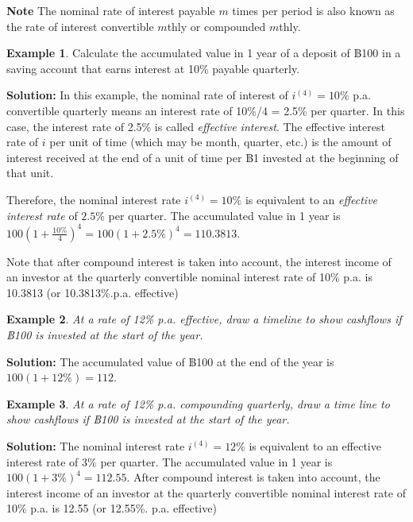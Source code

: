 \documentclass[
]{book}
\theoremstyle{definition}
\theoremstyle{definition}
\newtheorem{example}{Example}[chapter]
\theoremstyle{definition}
\theoremstyle{definition}
\theoremstyle{remark}
\begin{document}
\textbf{Note} The nominal rate of interest payable \(m\) times per period is also known as the rate of interest convertible \(m\)thly or compounded \(m\)thly.

\begin{example}
Calculate the accumulated value in 1 year of a deposit of ฿100 in a saving account that earns interest at 10\% payable quarterly.
\end{example}

\textbf{Solution:} In this example, the nominal rate of interest of \(i^{(4)} = 10\%\) p.a. convertible
quarterly means an interest rate of 10\%/4 = 2.5\% per quarter. In this case, the interest rate of 2.5\% is called \emph{effective interest}. The effective interest rate of \(i\) per unit of time (which may be month, quarter, etc.) is the amount of interest received at the end of a unit of time per ฿1 invested at the beginning of that unit.

Therefore, the nominal interest rate \(i^{(4)} = 10\%\) is equivalent to an
\emph{effective interest rate} of \(2.5\%\) per quarter.
The accumulated value in
1 year is \(100 (1 + \frac{10\%}{4})^4 = 100 (1 + 2.5\%)^4 = 110.3813\).

Note that after compound interest is
taken into account, the interest income of an investor at the quarterly
convertible nominal interest rate of 10\% p.a. is 10.3813 (or 10.3813\%.p.a. effective)

\begin{example}
\emph{At a rate of 12\% p.a. effective, draw a timeline to show cashflows if
฿100 is invested at the start of the year.}
\end{example}

\textbf{Solution:} The accumulated value of ฿100 at the end of the year is
\(100 (1 + 12\%) = 112\).

\begin{example}
\emph{At a rate of 12\% p.a. compounding quarterly, draw a time line to show
cashflows if ฿100 is invested at the start of the year.}
\end{example}

\textbf{Solution:} The nominal interest rate \(i^{(4)} = 12\%\) is equivalent
to an effective interest rate of \(3\%\) per quarter. The accumulated
value in 1 year is \(100 (1 + 3\%)^4 = 112.55\). After compound interest
is taken into account, the interest income of an investor at the
quarterly convertible nominal interest rate of 10\% p.a. is 12.55 (or
12.55\%. p.a. effective)
\end{document}

